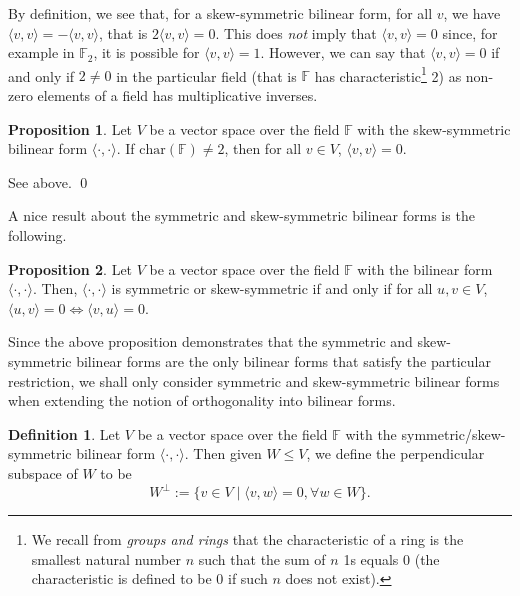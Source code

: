 \documentclass[
]{article}
\theoremstyle{definition}
\newtheorem{prop}{Proposition}[section]
\theoremstyle{definition}
\newtheorem{definition}{Definition}[section]
\begin{document}
By definition, we see that, for a skew-symmetric bilinear form, for all
\(v\), we have \(\langle v, v \rangle = -\langle v, v \rangle\), that is
\(2 \langle v, v \rangle = 0\). This does \emph{not} imply that
\(\langle v, v \rangle = 0\) since, for example in \(\mathbb{F}_2\), it
is possible for \(\langle v, v \rangle = 1\). However, we can say that
\(\langle v, v \rangle = 0\) if and only if \(2 \neq 0\) in the
particular field (that is \(\mathbb{F}\) has
characteristic\footnote{We recall from 
\textit{groups and rings} that the characteristic of a ring is the smallest 
natural number \(n\) such that the sum of \(n\) 1s equals 0 (the characteristic 
is defined to be 0 if such \(n\) does not exist).} 2) as non-zero
elements of a field has multiplicative inverses.

\begin{prop}
  Let \(V\) be a vector space over the field \(\mathbb{F}\) with the skew-symmetric 
  bilinear form \(\langle \cdot, \cdot \rangle\).
  If \(\text{char}(\mathbb{F}) \neq 2\), then for all \(v \in V\), 
  \(\langle v, v \rangle = 0\).
\end{prop}
\proof

See above. \qed

A nice result about the symmetric and skew-symmetric bilinear forms is
the following.

\begin{prop}
  Let \(V\) be a vector space over the field \(\mathbb{F}\) with the 
  bilinear form \(\langle \cdot, \cdot \rangle\). Then, 
  \(\langle \cdot, \cdot \rangle\) is symmetric or skew-symmetric if and only 
  if for all \(u, v \in V\), \(\langle u, v \rangle = 0 \iff 
  \langle v, u \rangle = 0\).
\end{prop}

Since the above proposition demonstrates that the symmetric and
skew-symmetric bilinear forms are the only bilinear forms that satisfy
the particular restriction, we shall only consider symmetric and
skew-symmetric bilinear forms when extending the notion of orthogonality
into bilinear forms.

\begin{definition}
  Let \(V\) be a vector space over the field \(\mathbb{F}\) with the 
  symmetric/skew-symmetric bilinear form \(\langle \cdot, \cdot \rangle\). 
  Then given \(W \le V\), we define the perpendicular subspace of \(W\) to be 
  \[W^\bot := \{v \in V \mid \langle v, w \rangle = 0, \forall w \in W\}.\]
\end{definition}
\end{document}
